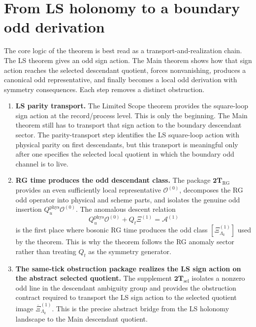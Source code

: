 \documentclass[
  aps,
  prd,
  onecolumn,
  notitlepage,
  nofootinbib,
  superscriptaddress,
  10pt
]{revtex4-2}
\theoremstyle{definition}
\theoremstyle{plain}
\begin{document}
\section{From LS holonomy to a boundary odd derivation}
\label{sec:cptp-brst}

The core logic of the theorem is best read as a transport-and-realization
chain.  The LS theorem gives an odd sign action.  The Main theorem shows how
that sign action reaches the selected descendant quotient, forces nonvanishing,
produces a canonical odd representative, and finally becomes a local odd
derivation with symmetry consequences.  Each step removes a distinct
obstruction.

\begin{enumerate}[label=\textnormal{(\arabic*)},leftmargin=*,itemsep=0.55em]
  \item \textbf{LS parity transport.}  The Limited Scope theorem
  provides the square-loop sign action at the record/process level.  This is
  only the beginning.  The Main theorem still has to transport that sign action
  to the boundary descendant sector.  The parity-transport step identifies the
  LS square-loop action with physical parity on first descendants, but this
  transport is meaningful only after one specifies the selected local quotient
  in which the boundary odd channel is to live.

  \item \textbf{RG time produces the odd descendant class.}  The package
  \(\mathbf{2T}_{\mathrm{RG}}\) provides an even sufficiently local
  representative \(\mathcal O^{(0)}\), decomposes the RG odd operator into
  physical and scheme parts, and isolates the genuine odd insertion
  \(Q_u^{\mathrm{phys}}\mathcal O^{(0)}\).  The anomalous descent relation
  \[
  Q_u^{\mathrm{phys}}\mathcal O^{(0)}+Q_t\Xi^{(1)}=\mathcal A^{(1)}
  \]
  is the first place where bosonic RG time produces the odd class
  \([\Xi^{(1)}_{\Lambda_k}]\) used by the theorem.  This is why the theorem
  follows the RG anomaly sector rather than treating \(Q_t\) as the symmetry
  generator.

  \item \textbf{The same-tick obstruction package realizes the LS sign action on
  the abstract selected quotient.}  The supplement
  \(\mathbf{2T}_{\mathrm{sel}}\) isolates a nonzero odd line in the descendant
  ambiguity group and provides the obstruction contract required to transport
  the LS sign action to the selected quotient image
  \(\overline{\Xi}^{(1)}_{\Lambda_k}\).  This is the precise abstract
  bridge from the LS holonomy landscape to the Main descendant quotient.


\end{enumerate}
\end{document}
